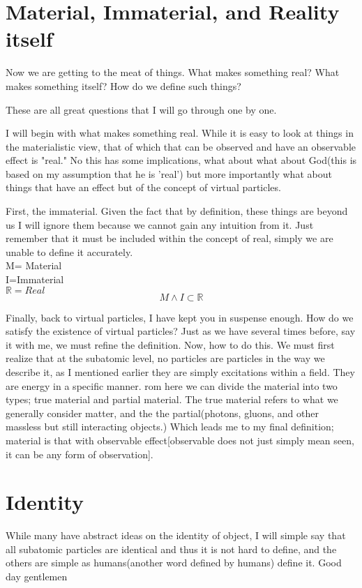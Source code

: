 \section{Material, Immaterial, and Reality itself}
\par Now we are getting to the meat of things. What makes something real? What makes something itself? How do we define such things?
\par These are all great questions that I will go through one by one.
\par I will begin with what makes something real. While it is easy to look at things in the materialistic view, that of which that can be observed and have an observable effect is "real." No this has some implications, what about what about God(this is based on my assumption that he is 'real') but more importantly what about things that have an effect but of the concept of virtual particles. 
\par First, the immaterial. Given the fact that by definition, these things are beyond us I will ignore them because we cannot gain any intuition from it. Just remember that it must be included within the concept of real, simply we are unable to define it accurately.\\
M= Material\\
I=Immaterial\\
$\mathbb{R}= Real$
$$
M \land I\subset \mathbb{R}
$$
\par Finally, back to virtual particles, I have kept you in suspense enough. How do we satisfy the existence of virtual particles? Just as we have several times before, say it with me, we must refine the definition. Now, how to do this. We must first realize that at the subatomic level, no particles are particles in the way we describe it, as I mentioned earlier they are simply excitations within a field. They are energy in a specific manner. rom here we can divide the material into two types; true material and partial material. The true material refers to what we generally consider matter, and the the partial(photons, gluons, and other massless but still interacting objects.) Which leads me to my final definition; material is that with observable effect[observable does not just simply mean seen, it can be any form of observation].
\section{Identity}
\par While many have abstract ideas on the identity of object, I will simple say that all subatomic particles are identical and thus it is not hard to define, and the others are simple as humans(another word defined by humans) define it. Good day gentlemen
